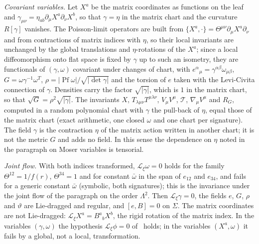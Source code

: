 \emph{Covariant variables.} Let \(X^a\) be the matrix coordinates as functions on the leaf and \(\gamma_{\mu\nu}=\eta_{ab}\partial_\mu X^a\partial_\nu X^b\), so that \(\gamma=\eta\) in the matrix chart and the curvature \(R[\gamma]\) vanishes. The Poisson-limit operators are built from \(\{X^a,\cdot\}=\Theta^{\mu\nu}\partial_\mu X^a\partial_\nu\) and from contractions of matrix indices with \(\eta\), so their local invariants are unchanged by the global translations and \(\eta\)-rotations of the \(X^a\); since a local diffeomorphism onto flat space is fixed by \(\gamma\) up to such an isometry, they are functionals of \((\gamma,\omega)\) covariant under changes of chart, with \(e^\alpha{}_\mu=\gamma^{\alpha\beta}\omega_{\mu\beta}\), \(G=\omega\gamma^{-1}\omega^T\), \(\rho=\lvert\operatorname{Pf}\omega\rvert/\sqrt{\lvert\det\gamma\rvert}\) and the torsion of \(e\) taken with the Levi-Civita connection of \(\gamma\). Densities carry the factor \(\sqrt{\lvert\gamma\rvert}\), which is \(1\) in the matrix chart, so that \(\sqrt G=\rho^2\sqrt{\lvert\gamma\rvert}\). The invariants \(X\), \(T_{\lambda\mu\nu}T^{\mu\lambda\nu}\), \(V_\mu V^\mu\), \(\mathcal T\), \(\nabla_\mu V^\mu\) and \(R_G\), computed in a random polynomial chart with \(\gamma\) the pull-back of \(\eta\), equal those of the matrix chart (exact arithmetic, one closed \(\omega\) and one chart per signature). The field \(\gamma\) is the contraction \(\eta\) of the matrix action written in another chart; it is not the metric \(G\) and adds no field. In this sense the dependence on \(\eta\) noted in the paragraph on Moser variables is tensorial.

\emph{Joint flow.} With both indices transformed, \(\mathcal L_\xi\omega=0\) holds for the family \(\Theta^{12}=1/f(r)\), \(\Theta^{34}=1\) and for constant \(\bar\omega\) in the span of \(e_{12}\) and \(e_{34}\), and fails for a generic constant \(\bar\omega\) (symbolic, both signatures); this is the invariance under the joint flow of the paragraph on the order \(\Lambda^2\). Then \(\mathcal L_\xi\gamma=0\), the fields \(e\), \(G\), \(\rho\) and \(\vartheta\) are Lie-dragged and regular, and \([e,B]=0\) on \(\Sigma\). The matrix coordinates are not Lie-dragged: \(\mathcal L_\xi X^a=B^a{}_bX^b\), the rigid rotation of the matrix index. In the variables \((\gamma,\omega)\) the hypothesis \(\mathcal L_\xi\phi=0\) of~\cite{IyerWald1994} holds; in the variables \((X^a,\omega)\) it fails by a global, not a local, transformation.

